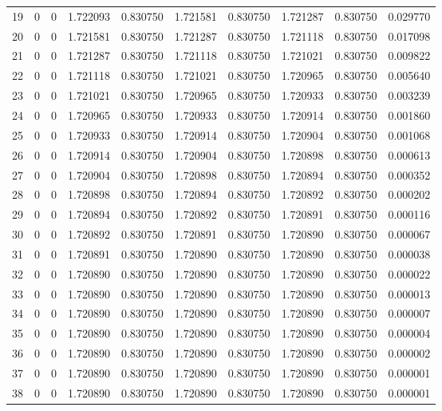 \documentclass[12pt, a4paper]{article}
\numberwithin{equation}{section}
\begin{document}
\begin{longtable}{cccccccccc}
        19 &  0 &  0 &  1.722093 &  0.830750 &  1.721581 &  0.830750 &  1.721287 &  0.830750 &  0.029770 \\ 
        20 &  0 &  0 &  1.721581 &  0.830750 &  1.721287 &  0.830750 &  1.721118 &  0.830750 &  0.017098 \\ 
        21 &  0 &  0 &  1.721287 &  0.830750 &  1.721118 &  0.830750 &  1.721021 &  0.830750 &  0.009822 \\ 
        22 &  0 &  0 &  1.721118 &  0.830750 &  1.721021 &  0.830750 &  1.720965 &  0.830750 &  0.005640 \\ 
        23 &  0 &  0 &  1.721021 &  0.830750 &  1.720965 &  0.830750 &  1.720933 &  0.830750 &  0.003239 \\ 
        24 &  0 &  0 &  1.720965 &  0.830750 &  1.720933 &  0.830750 &  1.720914 &  0.830750 &  0.001860 \\
        25 &  0 &  0 &  1.720933 &  0.830750 &  1.720914 &  0.830750 &  1.720904 &  0.830750 &  0.001068 \\ 
        26 &  0 &  0 &  1.720914 &  0.830750 &  1.720904 &  0.830750 &  1.720898 &  0.830750 &  0.000613 \\ 
        27 &  0 &  0 &  1.720904 &  0.830750 &  1.720898 &  0.830750 &  1.720894 &  0.830750 &  0.000352 \\ 
        28 &  0 &  0 &  1.720898 &  0.830750 &  1.720894 &  0.830750 &  1.720892 &  0.830750 &  0.000202 \\ 
        29 &  0 &  0 &  1.720894 &  0.830750 &  1.720892 &  0.830750 &  1.720891 &  0.830750 &  0.000116 \\ 
        30 &  0 &  0 &  1.720892 &  0.830750 &  1.720891 &  0.830750 &  1.720890 &  0.830750 &  0.000067 \\ 
        31 &  0 &  0 &  1.720891 &  0.830750 &  1.720890 &  0.830750 &  1.720890 &  0.830750 &  0.000038 \\ 
        32 &  0 &  0 &  1.720890 &  0.830750 &  1.720890 &  0.830750 &  1.720890 &  0.830750 &  0.000022 \\
        33 &  0 &  0 &  1.720890 &  0.830750 &  1.720890 &  0.830750 &  1.720890 &  0.830750 &  0.000013 \\ 
        34 &  0 &  0 &  1.720890 &  0.830750 &  1.720890 &  0.830750 &  1.720890 &  0.830750 &  0.000007 \\ 
        35 &  0 &  0 &  1.720890 &  0.830750 &  1.720890 &  0.830750 &  1.720890 &  0.830750 &  0.000004 \\ 
        36 &  0 &  0 &  1.720890 &  0.830750 &  1.720890 &  0.830750 &  1.720890 &  0.830750 &  0.000002 \\ 
        37 &  0 &  0 &  1.720890 &  0.830750 &  1.720890 &  0.830750 &  1.720890 &  0.830750 &  0.000001 \\ 
        38 &  0 &  0 &  1.720890 &  0.830750 &  1.720890 &  0.830750 &  1.720890 &  0.830750 &  0.000001 \\ 

\end{longtable}
\end{document}
